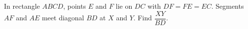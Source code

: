 In rectangle $ABCD$, points $E$ and $F$ lie on $DC$ with $DF=FE=EC$. Segments $AF$ and $AE$ meet diagonal $BD$ at $X$ and $Y$. Find $\dfrac{XY}{BD}$.
